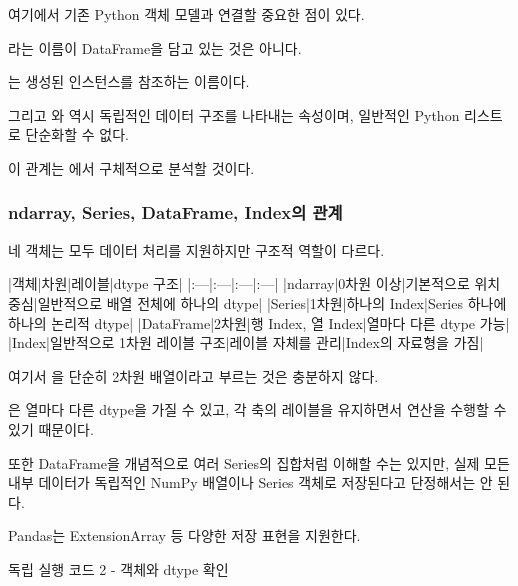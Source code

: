 여기에서 기존 Python 객체 모델과 연결할 중요한 점이 있다.

라는 이름이 DataFrame을 담고 있는 것은 아니다.

는 생성된  인스턴스를 참조하는 이름이다.

그리고 와  역시 독립적인 데이터 구조를 나타내는 속성이며, 일반적인 Python 리스트로 단순화할 수 없다.

이 관계는 에서 구체적으로 분석할 것이다.

\subsubsection{ndarray, Series, DataFrame, Index의 관계}

네 객체는 모두 데이터 처리를 지원하지만 구조적 역할이 다르다.

\begin{dhktable}
|객체|차원|레이블|dtype 구조|
|:---|:---|:---|:---|
|ndarray|0차원 이상|기본적으로 위치 중심|일반적으로 배열 전체에 하나의 dtype|
|Series|1차원|하나의 Index|Series 하나에 하나의 논리적 dtype|
|DataFrame|2차원|행 Index, 열 Index|열마다 다른 dtype 가능|
|Index|일반적으로 1차원 레이블 구조|레이블 자체를 관리|Index의 자료형을 가짐|
\end{dhktable}

여기서 을 단순히 2차원 배열이라고 부르는 것은 충분하지 않다.

은 열마다 다른 dtype을 가질 수 있고, 각 축의 레이블을 유지하면서 연산을 수행할 수 있기 때문이다.

또한 DataFrame을 개념적으로 여러 Series의 집합처럼 이해할 수는 있지만, 실제 모든 내부 데이터가 독립적인 NumPy 배열이나 Series 객체로 저장된다고 단정해서는 안 된다.

Pandas는 ExtensionArray 등 다양한 저장 표현을 지원한다.

\begin{dhknote}
\begin{dhksmry}[centered]
독립 실행 코드 2 - 객체와 dtype 확인
\end{dhksmry}
\end{dhknote}

